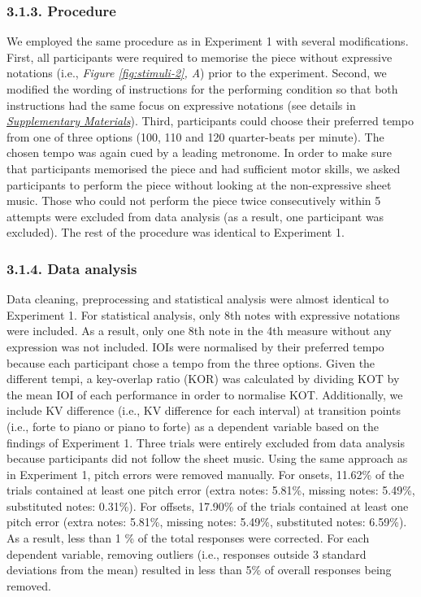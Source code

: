 \documentclass[
  english,
  man,floatsintext]{apa6}
\begin{document}
\hypertarget{procedure-2}{%
\subsubsection{3.1.3. Procedure}\label{procedure-2}}

We employed the same procedure as in Experiment 1 with several modifications. First, all participants were required to memorise the piece without expressive notations (i.e., \emph{Figure \ref{fig:stimuli-2}, A}) prior to the experiment. Second, we modified the wording of instructions for the performing condition so that both instructions had the same focus on expressive notations (see details in \emph{\protect\hyperlink{supplemental}{Supplementary Materials}}). Third, participants could choose their preferred tempo from one of three options (100, 110 and 120 quarter-beats per minute). The chosen tempo was again cued by a leading metronome. In order to make sure that participants memorised the piece and had sufficient motor skills, we asked participants to perform the piece without looking at the non-expressive sheet music. Those who could not perform the piece twice consecutively within 5 attempts were excluded from data analysis (as a result, one participant was excluded). The rest of the procedure was identical to Experiment 1.

\hypertarget{data-analysis-1}{%
\subsubsection{3.1.4. Data analysis}\label{data-analysis-1}}

Data cleaning, preprocessing and statistical analysis were almost identical to Experiment 1. For statistical analysis, only 8th notes with expressive notations were included. As a result, only one 8th note in the 4th measure without any expression was not included. IOIs were normalised by their preferred tempo because each participant chose a tempo from the three options. Given the different tempi, a key-overlap ratio (KOR) was calculated by dividing KOT by the mean IOI of each performance in order to normalise KOT. Additionally, we include KV difference (i.e., KV difference for each interval) at transition points (i.e., forte to piano or piano to forte) as a dependent variable based on the findings of Experiment 1. Three trials were entirely excluded from data analysis because participants did not follow the sheet music. Using the same approach as in Experiment 1, pitch errors were removed manually. For onsets, 11.62\% of the trials contained at least one pitch error (extra notes: 5.81\%, missing notes: 5.49\%, substituted notes: 0.31\%). For offsets, 17.90\% of the trials contained at least one pitch error (extra notes: 5.81\%, missing notes: 5.49\%, substituted notes: 6.59\%). As a result, less than 1 \% of the total responses were corrected. For each dependent variable, removing outliers (i.e., responses outside 3 standard deviations from the mean) resulted in less than 5\% of overall responses being removed.
\end{document}
